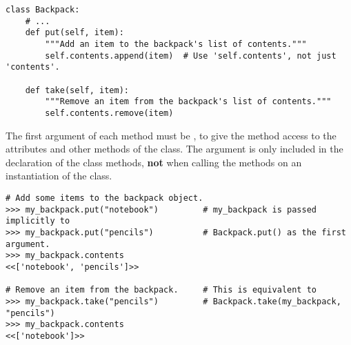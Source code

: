 \begin{lstlisting}
class Backpack:
    # ...
    def put(self, item):
        """Add an item to the backpack's list of contents."""
        self.contents.append(item)  # Use 'self.contents', not just 'contents'.

    def take(self, item):
        """Remove an item from the backpack's list of contents."""
        self.contents.remove(item)
\end{lstlisting}

The first argument of each method must be , to give the method access to the attributes and other methods of the class.
The  argument is only included in the declaration of the class methods, \textbf{not} when calling the methods on an instantiation of the class.

\begin{lstlisting}
# Add some items to the backpack object.
>>> my_backpack.put("notebook")         # my_backpack is passed implicitly to
>>> my_backpack.put("pencils")          # Backpack.put() as the first argument.
>>> my_backpack.contents
<<['notebook', 'pencils']>>

# Remove an item from the backpack.     # This is equivalent to
>>> my_backpack.take("pencils")         # Backpack.take(my_backpack, "pencils")
>>> my_backpack.contents
<<['notebook']>>
\end{lstlisting}

